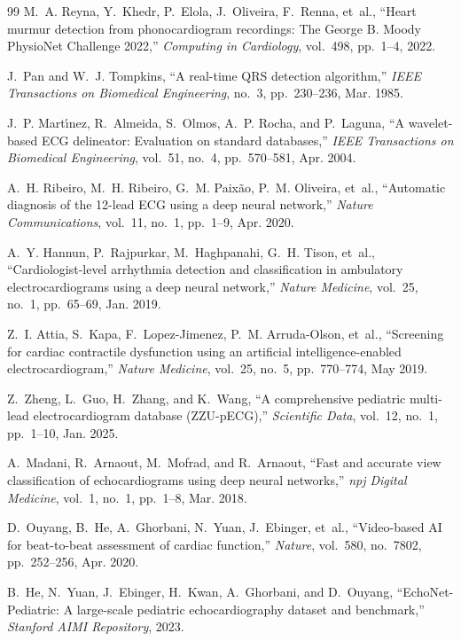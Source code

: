 \documentclass[12pt,a4paper]{amritareport}
\begin{document}
\begin{thebibliography}{99}
M.~A. Reyna, Y.~Khedr, P.~Elola, J.~Oliveira, F.~Renna, et~al.,
``Heart murmur detection from phonocardiogram recordings: The George B. Moody PhysioNet Challenge 2022,''
\textit{Computing in Cardiology}, vol.~498, pp.~1--4, 2022.

J.~Pan and W.~J. Tompkins,
``A real-time QRS detection algorithm,''
\textit{IEEE Transactions on Biomedical Engineering}, no.~3, pp.~230--236, Mar. 1985.

J.~P. Mart{\'\i}nez, R.~Almeida, S.~Olmos, A.~P. Rocha, and P.~Laguna,
``A wavelet-based ECG delineator: Evaluation on standard databases,''
\textit{IEEE Transactions on Biomedical Engineering}, vol.~51, no.~4, pp.~570--581, Apr. 2004.

A.~H. Ribeiro, M.~H. Ribeiro, G.~M. Paix{\~a}o, P.~M. Oliveira, et~al.,
``Automatic diagnosis of the 12-lead ECG using a deep neural network,''
\textit{Nature Communications}, vol.~11, no.~1, pp.~1--9, Apr. 2020.

A.~Y. Hannun, P.~Rajpurkar, M.~Haghpanahi, G.~H. Tison, et~al.,
``Cardiologist-level arrhythmia detection and classification in ambulatory electrocardiograms using a deep neural network,''
\textit{Nature Medicine}, vol.~25, no.~1, pp.~65--69, Jan. 2019.

Z.~I. Attia, S.~Kapa, F.~Lopez-Jimenez, P.~M. Arruda-Olson, et~al.,
``Screening for cardiac contractile dysfunction using an artificial intelligence-enabled electrocardiogram,''
\textit{Nature Medicine}, vol.~25, no.~5, pp.~770--774, May 2019.

Z.~Zheng, L.~Guo, H.~Zhang, and K.~Wang,
``A comprehensive pediatric multi-lead electrocardiogram database (ZZU-pECG),''
\textit{Scientific Data}, vol.~12, no.~1, pp.~1--10, Jan. 2025.

A.~Madani, R.~Arnaout, M.~Mofrad, and R.~Arnaout,
``Fast and accurate view classification of echocardiograms using deep neural networks,''
\textit{npj Digital Medicine}, vol.~1, no.~1, pp.~1--8, Mar. 2018.

D.~Ouyang, B.~He, A.~Ghorbani, N.~Yuan, J.~Ebinger, et~al.,
``Video-based AI for beat-to-beat assessment of cardiac function,''
\textit{Nature}, vol.~580, no.~7802, pp.~252--256, Apr. 2020.

B.~He, N.~Yuan, J.~Ebinger, H.~Kwan, A.~Ghorbani, and D.~Ouyang,
``EchoNet-Pediatric: A large-scale pediatric echocardiography dataset and benchmark,''
\textit{Stanford AIMI Repository}, 2023.


\end{thebibliography}
\end{document}
